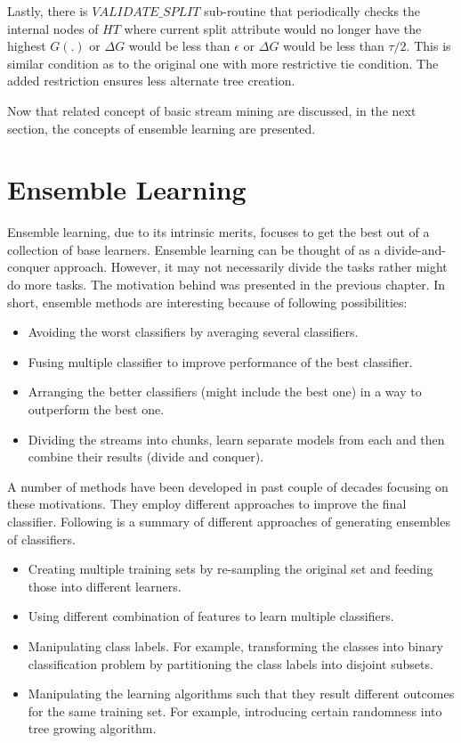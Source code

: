 Lastly, there is $VALIDATE\_SPLIT$ sub-routine that periodically checks the internal nodes of $HT$ where current split attribute would no longer have the highest $G(.)$ or $\Delta G$ would be less than $\epsilon$ or $\Delta G$ would be less than $\tau/2$. This is similar condition as to the original one with more restrictive tie condition. The added restriction ensures less alternate tree creation.

Now that related concept of basic stream mining are discussed, in the next section, the concepts of ensemble learning are presented.

\section{Ensemble Learning}
Ensemble learning, due to its intrinsic merits, focuses to get the best out of a collection of base learners. Ensemble learning can be thought of as a divide-and-conquer approach. However, it may not necessarily divide the tasks rather might do more tasks. The motivation behind was presented in the previous chapter. In short, ensemble methods are interesting because of following possibilities:
\begin{itemize}
    \item Avoiding the worst classifiers by averaging several classifiers.
    \item Fusing multiple classifier to improve performance of the best classifier.
    \item Arranging the better classifiers (might include the best one) in a way to outperform the best one.
    \item Dividing the streams into chunks, learn separate models from each and then combine their results (divide and conquer).
\end{itemize}

A number of methods have been developed in past couple of decades focusing on these motivations. They employ different approaches to improve the final classifier. Following is a summary of different approaches of generating ensembles of classifiers.
\begin{itemize}
    \item Creating multiple training sets by re-sampling the original set and feeding those into different learners.
    \item Using different combination of features to learn multiple classifiers.
    \item Manipulating class labels. For example, transforming the classes into binary classification problem by partitioning the class labels into disjoint subsets.
    \item Manipulating the learning algorithms such that they result different outcomes for the same training set. For example, introducing certain randomness into tree growing algorithm.
\end{itemize}


